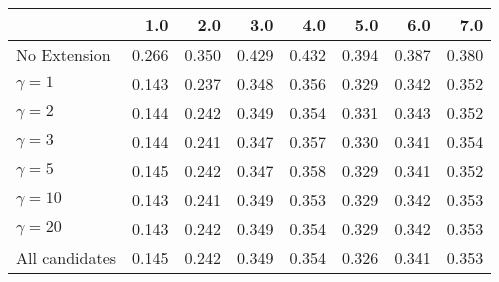 \begin{tabular}{lrrrrrrr}
\toprule
{} &   1.0 &   2.0 &   3.0 &   4.0 &   5.0 &   6.0 &   7.0 \\
\midrule
No Extension   & 0.266 & 0.350 & 0.429 & 0.432 & 0.394 & 0.387 & 0.380 \\
$\gamma = 1$   & 0.143 & 0.237 & 0.348 & 0.356 & 0.329 & 0.342 & 0.352 \\
$\gamma = 2$   & 0.144 & 0.242 & 0.349 & 0.354 & 0.331 & 0.343 & 0.352 \\
$\gamma = 3$   & 0.144 & 0.241 & 0.347 & 0.357 & 0.330 & 0.341 & 0.354 \\
$\gamma = 5$   & 0.145 & 0.242 & 0.347 & 0.358 & 0.329 & 0.341 & 0.352 \\
$\gamma = 10$  & 0.143 & 0.241 & 0.349 & 0.353 & 0.329 & 0.342 & 0.353 \\
$\gamma = 20$  & 0.143 & 0.242 & 0.349 & 0.354 & 0.329 & 0.342 & 0.353 \\
All candidates & 0.145 & 0.242 & 0.349 & 0.354 & 0.326 & 0.341 & 0.353 \\
\bottomrule
\end{tabular}
